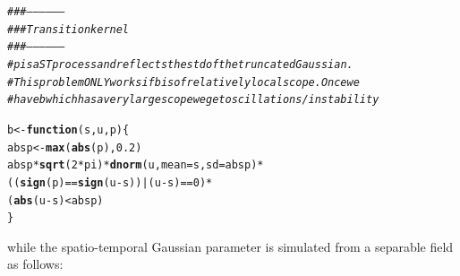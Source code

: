 \documentclass[a4paper,11pt]{article}\usepackage[]{graphicx}\usepackage[]{color}
\makeatletter
\newcommand{\hlnum}[1]{\textcolor[rgb]{0.686,0.059,0.569}{#1}}%
\newcommand{\hlcom}[1]{\textcolor[rgb]{0.678,0.584,0.686}{\textit{#1}}}%
\newcommand{\hlopt}[1]{\textcolor[rgb]{0,0,0}{#1}}%
\newcommand{\hlstd}[1]{\textcolor[rgb]{0.345,0.345,0.345}{#1}}%
\newcommand{\hlkwa}[1]{\textcolor[rgb]{0.161,0.373,0.58}{\textbf{#1}}}%
\newcommand{\hlkwb}[1]{\textcolor[rgb]{0.69,0.353,0.396}{#1}}%
\newcommand{\hlkwc}[1]{\textcolor[rgb]{0.333,0.667,0.333}{#1}}%
\newcommand{\hlkwd}[1]{\textcolor[rgb]{0.737,0.353,0.396}{\textbf{#1}}}%
\newenvironment{kframe}{%
 \def\at@end@of@kframe{}%
 \ifinner\ifhmode%
  \def\at@end@of@kframe{\end{minipage}}%
  \begin{minipage}{\columnwidth}%
 \fi\fi%
 \def\FrameCommand##1{\hskip\@totalleftmargin \hskip-\fboxsep
 \colorbox{shadecolor}{##1}\hskip-\fboxsep
     \hskip-\linewidth \hskip-\@totalleftmargin \hskip\columnwidth}%
 \MakeFramed {\advance\hsize-\width
   \@totalleftmargin\z@ \linewidth\hsize
   \@setminipage}}%
 {\par\unskip\endMakeFramed%
 \at@end@of@kframe}
\newenvironment{knitrout}{}{} %
\makeatother
\begin{document}
\begin{knitrout}
\color{fgcolor}\begin{kframe}
\begin{alltt}
\hlcom{###------------------}
\hlcom{### Transition kernel }
\hlcom{###------------------}
\hlcom{# p is a ST process and reflects the std of the truncated Gaussian.}
\hlcom{# This problem ONLY works if b is of relatively local scope. Once we }
\hlcom{# have b which has a very large scope we get oscillations/instability}

\hlstd{b} \hlkwb{<-} \hlkwa{function}\hlstd{(}\hlkwc{s}\hlstd{,}\hlkwc{u}\hlstd{,}\hlkwc{p}\hlstd{) \{}
  \hlstd{absp} \hlkwb{<-} \hlkwd{max}\hlstd{(}\hlkwd{abs}\hlstd{(p),}\hlnum{0.2}\hlstd{)}
  \hlstd{absp}\hlopt{*}\hlkwd{sqrt}\hlstd{(}\hlnum{2}\hlopt{*}\hlstd{pi)} \hlopt{*} \hlkwd{dnorm}\hlstd{(u,}\hlkwc{mean} \hlstd{= s,} \hlkwc{sd} \hlstd{=absp)} \hlopt{*}
    \hlstd{((}\hlkwd{sign}\hlstd{(p)} \hlopt{==} \hlkwd{sign}\hlstd{(u}\hlopt{-}\hlstd{s))} \hlopt{|} \hlstd{(u}\hlopt{-}\hlstd{s)} \hlopt{==} \hlnum{0}\hlstd{)} \hlopt{*}
    \hlstd{(}\hlkwd{abs}\hlstd{(u} \hlopt{-} \hlstd{s)} \hlopt{<} \hlstd{absp)}
\hlstd{\}}
\end{alltt}
\end{kframe}
\end{knitrout}

\noindent while the spatio-temporal Gaussian parameter is simulated from a separable field as follows:
\end{document}
